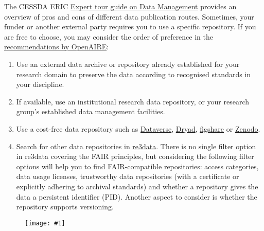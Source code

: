 \documentclass{article}
\newlength{\imgwidth}
\newcommand\scaledgraphics[2]{%
                
\settowidth{\imgwidth}{\texttt{[image: \#1]}}%
                
\setlength{\imgwidth}{\minof{\imgwidth}{#2\textwidth}}%
                
\texttt{[image: \#1]}%
                
}
\begin{document}
The CESSDA ERIC \href{https://www.cessda.eu/Research-Infrastructure/Training/Expert-tour-guide-on-Data-Management/6.-Archive-Publish/Data-publishing-routes}{Expert tour guide on Data Management} provides an overview of pros and cons of different data publication routes. Sometimes, your funder or another external party requires you to use a specific repository. If you are free to choose, you may consider the order of preference in the \href{https://www.openaire.eu/opendatapilot-repository-guide}{recommendations by OpenAIRE}:

\begin{enumerate}
\item Use an external data archive or repository already established for your research domain to preserve the data according to recognised standards in your discipline.


\item If available, use an institutional research data repository, or your research group’s established data management facilities.


\item Use a cost-free data repository such as \href{https://dataverse.org/}{Dataverse}, \href{https://datadryad.org/pages/faq#depositing-cost}{Dryad}, \href{https://figshare.com/}{figshare} or \href{https://zenodo.org/}{Zenodo}.


\item Search for other data repositories in \href{https://www.re3data.org/}{re3data}. There is no single filter option in re3data covering the FAIR principles, but considering the following filter options will help you to find FAIR-compatible repositories: access categories, data usage licenses, trustworthy data repositories (with a certificate or explicitly adhering to archival standards) and whether a repository gives the data a persistent identifier (PID). Another aspect to consider is whether the repository supports versioning.


\end{enumerate}
\begin{figure}
\scaledgraphics{774bc0a7-bf1a-40db-be3f-3fcfc057c3a6.png}{1}
\label{F57435701}
\end{figure}
\end{document}
